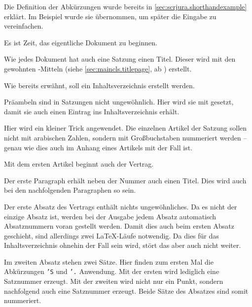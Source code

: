 Die Definition der Abkürzungen wurde bereits in
\autoref{sec:scrjura.shorthandexample} erklärt. Im Beispiel wurde sie
übernommen, um später die Eingabe zu vereinfachen.

%
Es ist Zeit, das eigentliche Dokument zu beginnen.

%
Wie jedes Dokument hat auch eine Satzung einen Titel. Dieser wird mit den
gewohnten \KOMAScript-Mitteln (siehe \autoref{sec:maincls.titlepage}, ab
) erstellt.

%
Wie bereits erwähnt, soll ein Inhaltsverzeichnis erstellt werden.

%
Präambeln sind in Satzungen nicht ungewöhnlich. Hier wird sie mit
 gesetzt, damit sie auch einen Eintrag ins
Inhaltsverzeichnis erhält.

%
Hier wird ein kleiner Trick angewendet. Die einzelnen Artikel der Satzung
sollen nicht mit arabischen Zahlen, sondern mit Großbuchstaben nummeriert
werden -- genau wie dies auch im Anhang eines Artikels mit 
der Fall ist.

%
Mit dem ersten Artikel beginnt auch der Vertrag.

%
Der erste Paragraph erhält neben der Nummer auch einen Titel. Dies wird auch
bei den nachfolgenden Paragraphen so sein. 

Der erste Absatz des Vertrags enthält nichts ungewöhnliches. Da es nicht der
einzige Absatz ist, werden bei der Ausgabe jedem Absatz automatisch
Absatznummern voran gestellt werden. Damit dies auch beim ersten Absatz
geschieht, sind allerdings zwei \LaTeX-Läufe notwendig. Da dies für das
Inhaltsverzeichnis ohnehin der Fall sein wird, stört das aber auch nicht
weiter.

Im zweiten Absatz stehen zwei Sätze. Hier finden zum ersten Mal die
Abkürzungen \texttt{'S} und
\texttt{'.} Anwendung. Mit der ersten wird lediglich eine Satznummer
erzeugt. Mit der zweiten wird nicht nur ein Punkt, sondern nachfolgend
auch eine Satznummer erzeugt. Beide Sätze des Absatzes sind somit nummeriert.


